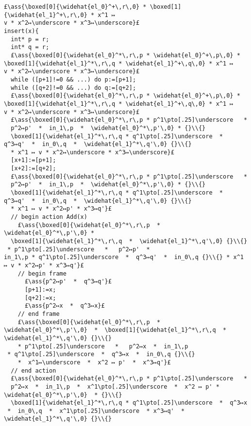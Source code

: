 \documentclass[12pt,a4paper]{article}
\makeatletter
\newcommand{\ml}[2][t]{\mbox{\mdseries\begin{tabular}[#1]{@{}L@{}}#2\end{tabular}}}
\newcommand{\ass}[1]{\ensuremath{{\color{blue}\left\{\ml[c]{#1}\right\}}}}
\makeatother
\begin{document}
\begin{lstlisting}
£\ass{\boxed[0]{\widehat{el_0}^+\,r\,0} * \boxed[1]{\widehat{el_1}^+\,r\,0} * x^1 ↦ v * x^2↦\underscore * x^3↦\underscore}£
insert(x){
  int* p = r;
  int* q = r;
  £\ass{\boxed[0]{\widehat{el_0}^*\,r\,p * \widehat{el_0}^+\,p\,0} * \boxed[1]{\widehat{el_1}^*\,r\,q * \widehat{el_1}^+\,q\,0} * x^1 ↦ v * x^2↦\underscore * x^3↦\underscore}£
  while ([p+1]!=0 && ...) do p:=[p+1];
  while ([q+2]!=0 && ...) do q:=[q+2];
  £\ass{\boxed[0]{\widehat{el_0}^*\,r\,p * \widehat{el_0}^+\,p\,0} * \boxed[1]{\widehat{el_1}^*\,r\,q * \widehat{el_1}^+\,q\,0} * x^1 ↦ v * x^2↦\underscore * x^3↦\underscore}£
  £\ass{\boxed[0]{\widehat{el_0}^*\,r\,p * p^1\pto[.25]\underscore   *   p^2↦p'  *  in_1\,p  *  \widehat{el_0}^*\,p'\,0} * {}\\{}
  \boxed[1]{\widehat{el_1}^*\,r\,q * q^1\pto[.25]\underscore  *  q^3↦q'  *  in_0\,q  *  \widehat{el_1}^*\,q'\,0} {}\\{} 
  * x^1 ↦ v * x^2↦\underscore * x^3↦\underscore}£
  [x+1]:=[p+1];
  [x+2]:=[q+2];
  £\ass{\boxed[0]{\widehat{el_0}^*\,r\,p * p^1\pto[.25]\underscore   *   p^2↦p'  *  in_1\,p  *  \widehat{el_0}^*\,p'\,0} * {}\\{}
  \boxed[1]{\widehat{el_1}^*\,r\,q * q^1\pto[.25]\underscore  *  q^3↦q'  *  in_0\,q  *  \widehat{el_1}^*\,q'\,0} {}\\{} 
  * x^1 ↦ v * x^2↦p' * x^3↦q'}£
  // begin action Add(x)
    £\ass{\boxed[0]{\widehat{el_0}^*\,r\,p  *  \widehat{el_0}^*\,p'\,0} * 
  \boxed[1]{\widehat{el_1}^*\,r\,q  *  \widehat{el_1}^*\,q'\,0} {}\\{} 
 * p^1\pto[.25]\underscore   *   p^2↦p'  *  in_1\,p * q^1\pto[.25]\underscore  *  q^3↦q'  *  in_0\,q {}\\{} * x^1 ↦ v * x^2↦p' * x^3↦q'}£
    // begin frame
      £\ass{p^2↦p'  *  q^3↦q'}£
      [p+1]:=x;
      [q+2]:=x;
      £\ass{p^2↦x  *  q^3↦x}£
    // end frame
    £\ass{\boxed[0]{\widehat{el_0}^*\,r\,p  *  \widehat{el_0}^*\,p'\,0}  *  \boxed[1]{\widehat{el_1}^*\,r\,q  *  \widehat{el_1}^*\,q'\,0} {}\\{} 
    * p^1\pto[.25]\underscore   *   p^2↦x  *  in_1\,p  * q^1\pto[.25]\underscore  *  q^3↦x  *  in_0\,q {}\\{} 
    *  x^1↦\underscore  *  x^2 ↦ p'  *  x^3↦q'}£
  // end action
  £\ass{\boxed[0]{\widehat{el_0}^*\,r\,p * p^1\pto[.25]\underscore   *   p^2↦x  *  in_1\,p  *  x^1\pto[.25]\underscore  *  x^2 ↦ p' *  \widehat{el_0}^*\,p'\,0}  * {}\\{}
  \boxed[1]{\widehat{el_1}^*\,r\,q * q^1\pto[.25]\underscore  *  q^3↦x  *  in_0\,q  *  x^1\pto[.25]\underscore  * x^3↦q'  *  \widehat{el_1}^*\,q'\,0} {}\\{} 

\end{lstlisting}
\end{document}
